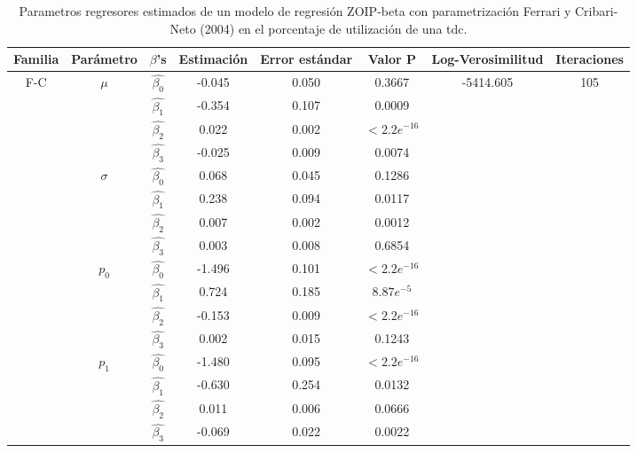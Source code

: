 \begin{table}[!hbt]
{\scriptsize
\begin{center}
\begin{tabular}{|c|c|c|ccc|c|c|}\hline
Familia & Par\'{a}metro & $\beta$'s & Estimaci\'{o}n & Error est\'{a}ndar & Valor P & Log-Verosimilitud & Iteraciones \\ \hline \hline
\multirow{12}{*}{F-C} & \multirow{4}{*}{$\mu$} & $\hat{\beta_0}$ & -0.045	&0.050	&0.3667  & \multirow{12}{*}{-5414.605} & \multirow{12}{*}{105} \\
& & $\hat{\beta_1}$ & -0.354	&0.107	&0.0009   & &\\
& & $\hat{\beta_2}$ & 0.022	&0.002	&$<2.2e^{-16}$   & &\\
& & $\hat{\beta_3}$ & -0.025	&0.009	&0.0074   & &\\ \cline{2-6}
& \multirow{4}{*}{$\sigma$} & $\hat{\beta_0}$ & 0.068	&0.045	&0.1286   & &\\
& & $\hat{\beta_1}$ & 0.238	&0.094	&0.0117   & &\\
& & $\hat{\beta_2}$ & 0.007	&0.002	&0.0012   & &\\
& & $\hat{\beta_3}$ & 0.003	&0.008	&0.6854   & &\\ \cline{2-6}
& \multirow{4}{*}{$p_0$} & $\hat{\beta_0}$ & -1.496	&0.101	&$<2.2e^{-16}$  & &\\
& & $\hat{\beta_1}$ & 0.724	&0.185	&$8.87e^{-5}$  & &\\
& & $\hat{\beta_2}$ & -0.153	&0.009	&$<2.2e^{-16}$  & &\\
& & $\hat{\beta_3}$ & 0.002	&0.015	&0.1243  & &\\ \cline{2-6}
& \multirow{4}{*}{$p_1$} & $\hat{\beta_0}$ &-1.480	&0.095	&$<2.2e^{-16}$  & &\\
& & $\hat{\beta_1}$ & -0.630	&0.254	&0.0132  & &\\
& & $\hat{\beta_2}$ & 0.011	&0.006	&0.0666  & &\\
& & $\hat{\beta_3}$ & -0.069	&0.022	&0.0022  & &\\ \hline

\end{tabular}
\caption{Parametros regresores estimados de un modelo de regresi\'{o}n ZOIP-beta con parametrizaci\'{o}n Ferrari y Cribari-Neto (2004) en el porcentaje de utilizaci\'{o}n de una tdc.}
\label{T_Apli_CC_FC}
\end{center}
}
\end{table}



